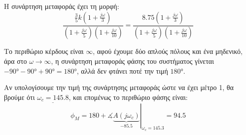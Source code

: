 \documentclass[11pt,a4paper,notitlepage,fleqn,final]{article}
\begin{document}
\begin{exercise}[Παράδειγμα]
\tcbsubtitle{}
Η συνάρτηση μεταφοράς έχει τη μορφή:
\[
\frac{\frac{3}{5}k \left(1+\frac{j\omega }{3}\right)  }{\left( 1+\frac{j\omega }{5} \right)
	\left(1+\frac{j\omega }{10}\right)}
= \frac{8.75 \left(1+\frac{j\omega }{3}\right)  }{\left( 1+\frac{j\omega }{5} \right)
	\left(1+\frac{j\omega }{10}\right)}
\]

Το περιθώριο κέρδους είναι \( \infty \), αφού έχουμε δύο απλούς πόλους και ένα μηδενικό,
άρα στο \( \omega\to \infty \), η συνάρτηση μεταφοράς φάσης του συστήματος γίνεται
\( -\ang{90}-\ang{90}+\ang{90} = \ang{180} \), αλλά δεν φτάνει ποτέ την τιμή \( \ang{180} \).

Αν υπολογίσουμε την τιμή της συνάρτησης μεταφοράς ώστε να έχει μέτρο 1, θα βρούμε ότι
\( \underline{\omega_c = 145.8} \), και επομένως το περιθώριο φάσης είναι:
\[
\phi_M = \left. 180 + \measuredangle \underbrace{A(j\omega_c)}_{-85.5}
\right|_{\omega_c=145.3} = 94.5
\]

\end{exercise}
\end{document}
